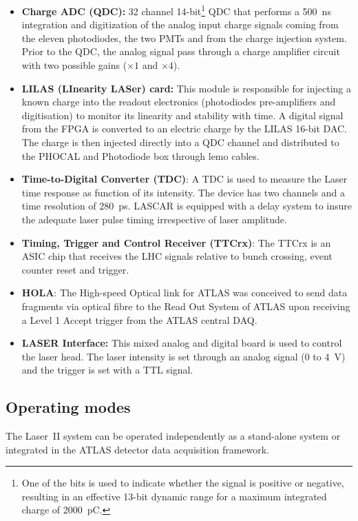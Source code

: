 \begin{itemize}

\item \textbf{Charge ADC (QDC):} 32 channel 14-bit\footnote{One of the bits is used to indicate whether the signal is positive or negative, resulting in an effective 13-bit dynamic range for a maximum integrated charge of 2000~pC.} QDC that performs a 500~ns integration and digitization of the analog input charge signals coming from the eleven photodiodes, the two PMTs and from the charge injection system. Prior to the QDC, the analog signal pass through a charge amplifier circuit with two possible gains ($\times 1$ and $\times 4$).
\item \textbf{LILAS (LInearity LASer) card:} This module is responsible for injecting a known charge into the readout electronics (photodiodes pre-amplifiers and digitisation) to monitor its linearity and stability with time. A digital signal from the FPGA is converted to an electric charge by the LILAS 16-bit DAC. The charge is then injected directly into a QDC channel and distributed to the PHOCAL and Photodiode box through lemo cables.
\item \textbf{Time-to-Digital Converter (TDC)}: A TDC is used to measure the Laser time response as function of its intensity. The device has two channels and a time resolution of 280~ps. LASCAR is equipped with a delay system to insure the adequate laser pulse timing irrespective of laser amplitude.
\item \textbf{Timing, Trigger and Control Receiver (TTCrx)}: The TTCrx is an ASIC chip that receives the LHC signals relative to bunch crossing, event counter reset and trigger.
\item \textbf{HOLA}: The High-speed Optical link for ATLAS was conceived to send data fragments via optical fibre to the Read Out System of ATLAS upon receiving a Level 1 Accept trigger from the ATLAS central DAQ.
\item \textbf{LASER Interface:} This mixed analog and digital board is used to control the laser head. The laser intensity is set through an analog signal (0 to 4~V) and the trigger is set with a TTL signal.
\end{itemize}


\subsection{Operating modes}

The Laser~II system can be operated independently as a stand-alone system or integrated in the ATLAS detector data acquisition framework.

